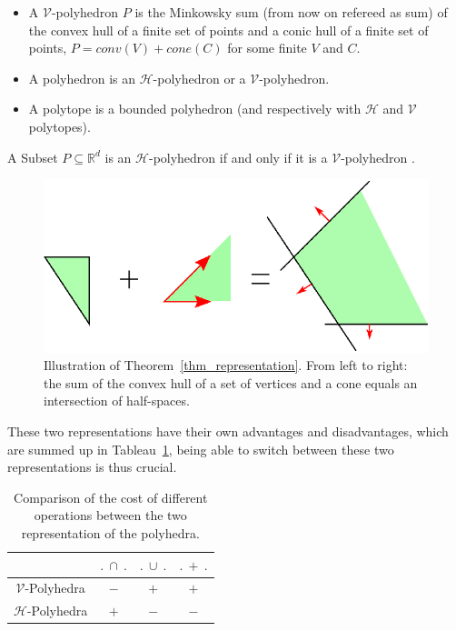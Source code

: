 \begin{definition}
\begin{itemize}
	\item A $\mathcal{V}$-polyhedron $P$ is the Minkowsky sum (from now on refereed as sum) of the convex hull of a finite set of points and a conic hull of a finite set of points, $P=conv(V)+cone(C)$ for some finite $V$ and $C$.
	\item A polyhedron is an $\mathcal{H}$-polyhedron or a $\mathcal{V}$-polyhedron.
	\item A polytope is a bounded polyhedron (and respectively with $\mathcal{H}$ and $\mathcal{V}$ polytopes).
	\end{itemize}
\end{definition}
 

\begin{theorem}
A Subset $P\subseteq\mathbb{R}^d$ is an $\mathcal{H}$-polyhedron if and only if it is a $\mathcal{V}$-polyhedron \cite{ziegler_polytopes}.
\label{thm_representation}
\end{theorem} 

\begin{figure}
\includegraphics[scale=1]{images/poly.eps}
\caption{Illustration of Theorem~\ref{thm_representation}. From left to right: the sum of the convex hull of a set of vertices and a cone equals an intersection of half-spaces.}
\end{figure}

These two representations have their own advantages and disadvantages, which are summed up  in Tableau~\ref{comparison tab}, being able to switch between these two representations is thus crucial.

\begin{table}
\begin{tabular}{| c | c | c | c |}
	\hline	
				    & $.\ \cap\ .$ & $.\ \cup\ .$ & $.\ +\ .$ \\ \hline
	$\mathcal{V}$-Polyhedra   & $-$ & $+$ & $+$ \\ \hline
   	$\mathcal{H}$-Polyhedra   & $+$ & $-$ & $-$\\ \hline
\end{tabular}
\caption{Comparison of the cost of different operations between the two representation of the polyhedra.}
\label{comparison tab}
\end{table}

